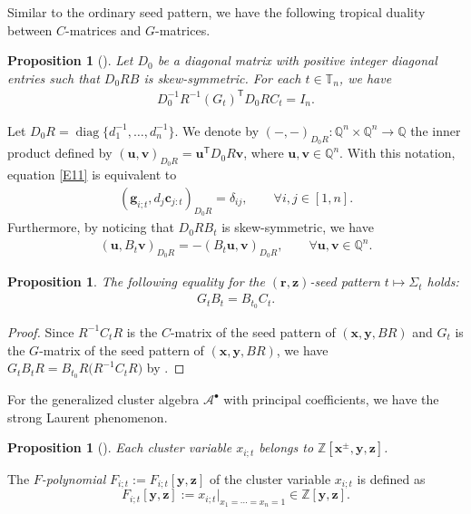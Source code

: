 \documentclass[pdftex]{sigma}
\numberwithin{equation}{section}
\newtheorem{Proposition}[Theorem]{Proposition}
 { \theoremstyle{definition}
\newtheorem{Definition}[Theorem]{Definition}
\newtheorem{Note}[Theorem]{Note}
\newtheorem{Example}[Theorem]{Example}
\newtheorem{Remark}[Theorem]{Remark} }
\begin{document}
Similar to the ordinary seed pattern, we have the following tropical duality between $C$-matrices and $G$-matrices.
\begin{Proposition}[{\cite[Proposition 3.21]{Nakanishi14}}]\label{P4}
 Let $D_0$ be a diagonal matrix with positive integer diagonal entries such that $D_0RB$ is skew-symmetric. For each $t\in \mathbb{T}_n$, we have
\begin{align}\label{E11}
D_0^{-1}R^{-1}(G_t)^{\mathsf T}D_0RC_t=I_n.
\end{align}
\end{Proposition}
Let $D_0R=\operatorname{diag}\bigl\{d_1^{-1},\dots, d_n^{-1}\bigr\}$. We denote by $(-,-)_{D_0R}\colon \mathbb{Q}^n\times \mathbb{Q}^n\to \mathbb{Q}$ the inner product defined by $(\mathbf{u},\mathbf{v})_{D_0R}=\mathbf{u}^{\mathsf T}D_0R\mathbf{v}$, where $\mathbf{u},\mathbf{v}\in \mathbb{Q}^n$. With this notation, equation \eqref{E11} is equivalent to
\begin{align}\label{E12}
 (\mathbf{g}_{i;t},d_j\mathbf{c}_{j:t})_{D_0R}=\delta_{ij},\qquad \forall i,j\in[1,n].
\end{align}
Furthermore, by noticing that $D_0RB_t$ is skew-symmetric, we have
\begin{align*}
 (\mathbf{u},B_t\mathbf{v})_{D_0R}=-(B_t\mathbf{u},\mathbf{v})_{D_0R},\qquad \forall  \mathbf{u},\mathbf{v}\in \mathbb{Q}^n.
\end{align*}

\begin{Proposition}\label{P5}
 The following equality for the $(\mathbf{r},\mathbf{z})$-seed pattern $t\mapsto \Sigma_t$ holds:
 \begin{align}\label{E14}
 G_tB_t=B_{t_0}C_t.
 \end{align}
\end{Proposition}
\begin{proof}
Since $R^{-1}C_tR$ is the $C$-matrix of the seed pattern of $(\mathbf{x},\mathbf{y}, BR)$ and $G_t$ is the $G$-matrix of the seed pattern of $(\mathbf{x},\mathbf{y}, BR)$, we have
$
G_tB_tR=B_{t_0}R\bigl(R^{-1}C_tR\bigr)
$
by \cite[equation~(6.14)]{fomin_zelevinsky_2007}.
\end{proof}

For the generalized cluster algebra $\mathcal{A}^\bullet$ with principal coefficients, we have the strong Laurent phenomenon.
\begin{Proposition}[{\cite[Proposition 3.3]{Nakanishi14}}]
 Each cluster variable $x_{i;t}$ belongs to $\mathbb{Z}[\mathbf{x}^\pm,\mathbf{y},\mathbf{z}]$.
\end{Proposition}
\begin{Definition}
 The {\it $F$-polynomial} $F_{i;t}:=F_{i;t}[\mathbf{y},\mathbf{z}]$ of the cluster variable $x_{i;t}$ is defined as
 \[
 F_{i;t}[\mathbf{y},\mathbf{z}]:=x_{i;t}|_{x_1=\cdots=x_n=1}\in \mathbb{Z}[\mathbf{y},\mathbf{z}].
 \]
\end{Definition}
\end{document}
